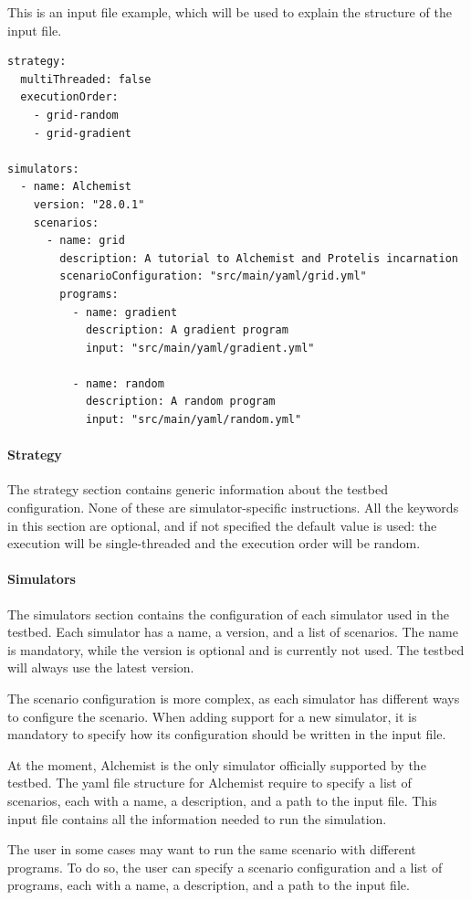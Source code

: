 \documentclass[12pt,a4paper,openright,twoside]{book}
\begin{document}
This is an input file example, which will be used to explain the structure of the input file.

\begin{lstlisting}[style=yaml]
strategy:
  multiThreaded: false
  executionOrder:
    - grid-random
    - grid-gradient

simulators:
  - name: Alchemist
    version: "28.0.1"
    scenarios:
      - name: grid
        description: A tutorial to Alchemist and Protelis incarnation
        scenarioConfiguration: "src/main/yaml/grid.yml"
        programs:
          - name: gradient
            description: A gradient program
            input: "src/main/yaml/gradient.yml"

          - name: random
            description: A random program
            input: "src/main/yaml/random.yml"
\end{lstlisting}

\paragraph*{Strategy} The strategy section contains generic information about the testbed configuration. None of these 
are simulator-specific instructions.
All the keywords in this section are optional, and if not specified the default value is used: the execution will be
single-threaded and the execution order will be random.

\paragraph*{Simulators} The simulators section contains the configuration of each simulator used in the testbed.
Each simulator has a name, a version, and a list of scenarios. The name is mandatory, while the version is optional 
and is currently not used. The testbed will always use the latest version.

The scenario configuration is more complex, as each simulator has different ways to configure the scenario.
When adding support for a new simulator, it is mandatory to specify how its configuration should be written in the input file.

At the moment, Alchemist is the only simulator officially supported by the testbed.
The yaml file structure for Alchemist require to specify a list of scenarios, each with a name, a description, and a path to the input file.
This input file contains all the information needed to run the simulation.

The user in some cases may want to run the same scenario with different programs.
To do so, the user can specify a scenario configuration and a list of programs, each with a name, a description, and a path to the input file.
\end{document}

